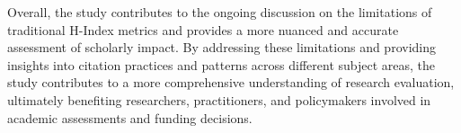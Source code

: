 Overall, the study contributes to the ongoing discussion on the limitations of
traditional H-Index metrics and provides a more nuanced and accurate assessment
of scholarly impact. By addressing these limitations and providing insights
into citation practices and patterns across different subject areas, the study
contributes to a more comprehensive understanding of research evaluation,
ultimately benefiting researchers, practitioners, and policymakers involved in
academic assessments and funding decisions.
